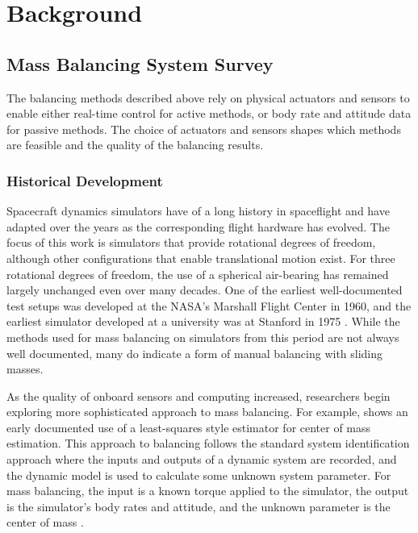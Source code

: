 \chapter{Background}\label{chap:background}

 
\section{Mass Balancing System Survey}

The balancing methods described above rely on physical actuators and sensors to enable either real-time control for active methods, or body rate and attitude data for passive methods. The choice of actuators and sensors shapes which methods are feasible and the quality of the balancing results.

\subsection{Historical Development}

Spacecraft dynamics simulators have of a long history in spaceflight and have adapted over the years as the corresponding flight hardware has evolved. The focus of this work is simulators that provide rotational degrees of freedom, although other configurations that enable translational motion exist. For three rotational degrees of freedom, the use of a spherical air-bearing has remained largely unchanged even over many decades. One of the earliest well-documented test setups was developed at the NASA's Marshall Flight Center in 1960, and the earliest simulator developed at a university was at Stanford in 1975 \cites{schwartz_historical_2003}. While the methods used for mass balancing on simulators from this period are not always well documented, many do indicate a form of manual balancing with sliding masses.

As the quality of onboard sensors and computing increased, researchers begin exploring more sophisticated approach to mass balancing. For example, \cite{young1998development} shows an early documented use of a least-squares style estimator for center of mass estimation. This approach to balancing follows the standard system identification approach where the inputs and outputs of a dynamic system are recorded, and the dynamic model is used to calculate some unknown system parameter. For mass balancing, the input is a known torque applied to the simulator, the output is the simulator's body rates and attitude, and the unknown parameter is the center of mass \cite{schwartz2004comparison}.

